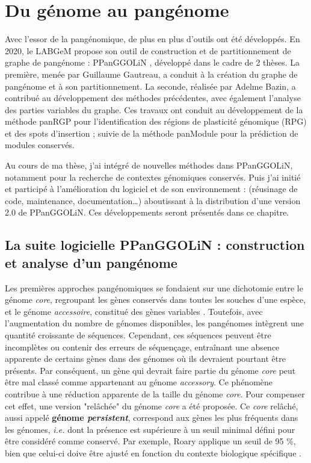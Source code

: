 \part{Du génome au pangénome}

Avec l'essor de la pangénomique, de plus en plus d'outils ont été développés. En 2020, le LABGeM propose son outil de construction et de partitionnement de graphe de pangénome : PPanGGOLiN \cite{gautreau_ppanggolin_2020}, développé dans le cadre de 2 thèses. La première, menée par Guillaume Gautreau, a conduit à la création du graphe de pangénome et à son partitionnement. La seconde, réalisée par Adelme Bazin, a contribué au développement des méthodes précédentes, avec également l’analyse des parties variables du graphe. Ces travaux ont conduit au développement de la méthode panRGP \cite{bazin_panrgp_2020} pour l’identification des régions de plasticité génomique (RPG) et des spots d'insertion ; suivie de la méthode panModule \cite{bazin_panmodule_2021} pour la prédiction de modules conservés.

Au cours de ma thèse, j'ai intégré de nouvelles méthodes dans PPanGGOLiN, notamment pour la recherche de contextes génomiques conservés. Puis j'ai initié et participé à l'amélioration du logiciel et de son environnement : (réusinage de code, maintenance, documentation\dots) aboutissant à la distribution d'une version 2.0 de PPanGGOLiN. Ces développements seront présentés dans ce chapitre.

\chapter{La suite logicielle PPanGGOLiN : construction et analyse d'un pangénome}

Les premières approches pangénomiques se fondaient sur une dichotomie entre le génome \textit{core}, regroupant les gènes conservés dans toutes les souches d'une espèce, et le génome \textit{accessoire}, constitué des gènes variables \cite{tettelin_genome_2005}. Toutefois, avec l'augmentation du nombre de génomes disponibles, les pangénomes intègrent une quantité croissante de séquences. Cependant, ces séquences peuvent être incomplètes ou contenir des erreurs de séquençage, entraînant une absence apparente de certains gènes dans des génomes où ils devraient pourtant être présents. Par conséquent, un gène qui devrait faire partie du génome \textit{core} peut être mal classé comme appartenant au génome \textit{accessory}. Ce phénomène contribue à une réduction apparente de la taille du génome \textit{core}. Pour compenser cet effet, une version "relâchée" du génome \textit{core} a été proposée. Ce \textit{core} relâché, aussi appelé \textbf{génome \textit{persistent}}, correspond aux gènes les plus fréquents dans les génomes, \textit{i.e.} dont la présence est supérieure à un seuil minimal défini pour être considéré comme conservé. Par exemple, Roary \cite{page_roary_2015} applique un seuil de 95 \%, bien que celui-ci doive être ajusté en fonction du contexte biologique spécifique \cite{tonder_defining_2014}.

